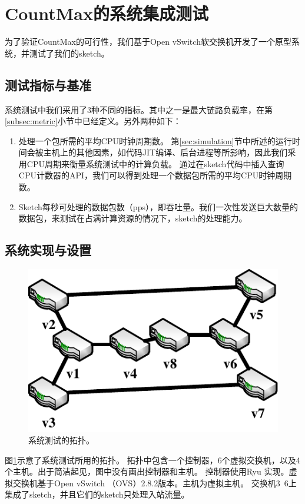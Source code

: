 \section{CountMax的系统集成测试}\label{sec:proto}

为了验证CountMax的可行性，我们基于Open vSwitch软交换机开发了一个原型系统，并测试了我们的sketch。

\subsection{测试指标与基准}\label{sec:testbedmetric}
系统测试中我们采用了3种不同的指标。其中之一是最大链路负载率，在第\ref{subsec:metric}小节中已经定义。另外两种如下：
\begin{enumerate}
	\item
    处理一个包所需的平均CPU时钟周期数。
    第\ref{sec:simulation}节中所述的运行时间会被主机上的其他因素，如代码JIT编译、后台进程等所影响，因此我们采用CPU周期来衡量系统测试中的计算负载\cite{huang2017sketchvisor}。
    通过在sketch代码中插入查询CPU计数器的API，我们可以得到处理一个数据包所需的平均CPU时钟周期数。
	\item
    Sketch每秒可处理的数据包数（pps），即吞吐量。我们一次性发送巨大数量的数据包，来测试在占满计算资源的情况下，sketch的处理能力。
\end{enumerate}


\subsection{系统实现与设置}
\begin{figure}[ht]
	\centering
	\includegraphics[width=0.68\linewidth]{fig/topo.pdf}
	\caption{\textnormal{系统测试的拓扑。}}
	\label{fig:prototypetopo}
\end{figure}

图\ref{fig:prototypetopo}示意了系统测试所用的拓扑。
拓扑中包含一个控制器，6个虚拟交换机，以及4个主机。出于简洁起见，图中没有画出控制器和主机。
控制器使用Ryu \cite{ryu}实现。虚拟交换机基于Open vSwitch （OVS）2.8.2版本\cite{openvswitch}。主机为虚拟主机。
交换机3~6上集成了sketch，并且它们的sketch只处理入站流量。

